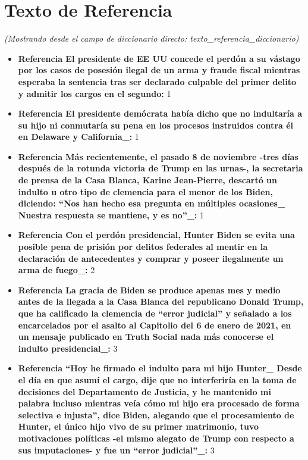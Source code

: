 \documentclass[10pt,a4paper]{article}
\begin{document}
\section*{Texto de Referencia}
    \textit{(Mostrando desde el campo de diccionario directo: texto\_referencia\_diccionario)}
    \begin{itemize}[leftmargin=*]
            \item \textbf{Referencia El presidente de EE UU concede el perd\'{o}n a su v\'{a}stago por los casos de posesi\'{o}n ilegal de un arma y fraude fiscal mientras esperaba la sentencia tras ser declarado culpable del primer delito y admitir los cargos en el segundo:} 1
            \item \textbf{Referencia El presidente dem\'{o}crata hab\'{i}a dicho que no indultar\'{i}a a su hijo ni conmutar\'{i}a su pena en los procesos instruidos contra \'{e}l en Delaware y California\_:} 1
            \item \textbf{Referencia M\'{a}s recientemente, el pasado 8 de noviembre -tres d\'{i}as despu\'{e}s de la rotunda victoria de Trump en las urnas-, la secretaria de prensa de la Casa Blanca, Karine Jean-Pierre, descart\'{o} un indulto u otro tipo de clemencia para el menor de los Biden, diciendo: ``Nos han hecho esa pregunta en m\'{u}ltiples ocasiones\_ Nuestra respuesta se mantiene, y es no''\_:} 1
            \item \textbf{Referencia Con el perd\'{o}n presidencial, Hunter Biden se evita una posible pena de prisi\'{o}n por delitos federales al mentir en la declaraci\'{o}n de antecedentes y comprar y poseer ilegalmente un arma de fuego\_:} 2
            \item \textbf{Referencia La gracia de Biden se produce apenas mes y medio antes de la llegada a la Casa Blanca del republicano Donald Trump, que ha calificado la clemencia de ``error judicial'' y se\~{n}alado a los encarcelados por el asalto al Capitolio del 6 de enero de 2021, en un mensaje publicado en Truth Social nada m\'{a}s conocerse el indulto presidencial\_:} 3
            \item \textbf{Referencia ``Hoy he firmado el indulto para mi hijo Hunter\_ Desde el d\'{i}a en que asum\'{i} el cargo, dije que no interferir\'{i}a en la toma de decisiones del Departamento de Justicia, y he mantenido mi palabra incluso mientras ve\'{i}a c\'{o}mo mi hijo era procesado de forma selectiva e injusta'', dice Biden, alegando que el procesamiento de Hunter, el \'{u}nico hijo vivo de su primer matrimonio, tuvo motivaciones pol\'{i}ticas -el mismo alegato de Trump con respecto a sus imputaciones- y fue un ``error judicial''\_:} 3

\end{itemize}
\end{document}
